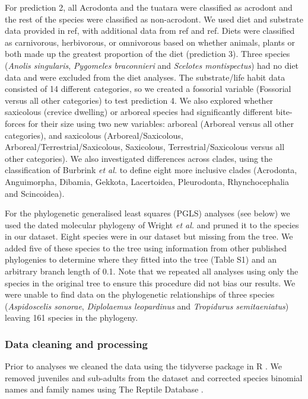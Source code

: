 \documentclass[a4paper, 12pt]{article}
\begin{document}
For prediction 2, all Acrodonta and the tuatara were classified as acrodont and the rest of the species were classified as non-acrodont.
We used diet and substrate data provided in ref\cite{meiri2018traits}, with additional data from ref\cite{metzger2005correlations} and ref\cite{cooper2002distribution}. 
Diets were classified as carnivorous, herbivorous, or omnivorous based on whether animals, plants or both made up the greatest proportion of the diet (prediction 3\cite{meiri2018traits}).
Three species (\textit{Anolis singularis}, \textit{Pygomeles braconnieri} and \textit{Scelotes montispectus}) had no diet data and were excluded from the diet analyses. 
The substrate/life habit data\cite{meiri2018traits} consisted of 14 different categories, so we created a fossorial variable (Fossorial versus all other categories) to test prediction 4.  
We also explored whether saxicolous (crevice dwelling) or arboreal species had significantly different bite-forces for their size using two new variables: arboreal (Arboreal versus all other categories), and saxicolous (Arboreal/Saxicolous, Arboreal/Terrestrial/Saxicolous, Saxicolous, Terrestrial/Saxicolous versus all other categories). 
We also investigated differences across clades, using the classification of Burbrink \textit{et al.}\cite{burbrink2020interrogating} to define eight more inclusive clades (Acrodonta, Anguimorpha, Dibamia, Gekkota, Lacertoidea, Pleurodonta, Rhynchocephalia and Scincoidea). 

For the phylogenetic generalised least squares (PGLS) analyses (see below) we used the dated molecular phylogeny of Wright \textit{et al.}\cite{wright2015came} and pruned it to the species in our dataset. 
Eight species were in our dataset but missing from the tree. We added five of these species to the tree using information from other published phylogenies to determine where they fitted into the tree (Table S1) and an arbitrary branch length of 0.1. 
Note that we repeated all analyses using only the species in the original tree to ensure this procedure did not bias our results. We were unable to find data on the phylogenetic relationships of three species (\textit{Aspidoscelis sonorae}, \textit{Diplolaemus leopardinus} and \textit{Tropidurus semitaeniatus}) leaving 161 species in the phylogeny.

\subsubsection{Data cleaning and processing}
Prior to analyses we cleaned the data using the tidyverse package \cite{wickham2019welcome} in R \cite{R-Core-Team:2020}. 
We removed juveniles and sub-adults from the dataset and corrected species binomial names and family names using The Reptile Database \cite{uetz2020reptile}. 
\end{document}
